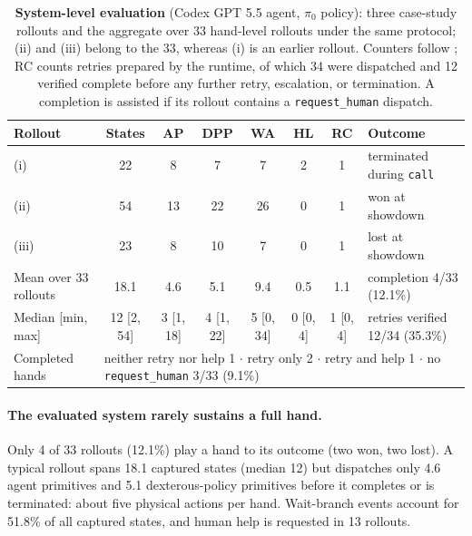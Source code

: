 \begin{table}[t]
    \caption{\textbf{System-level evaluation} (Codex GPT 5.5 agent, $\pi_0$ policy): three case-study rollouts and the aggregate over 33 hand-level rollouts under the same protocol; (ii) and (iii) belong to the 33, whereas (i) is an earlier rollout. Counters follow ; RC counts retries prepared by the runtime, of which 34 were dispatched and 12 verified complete before any further retry, escalation, or termination. A completion is assisted if its rollout contains a \texttt{request\_human} dispatch.}
    \label{tab:system_trajectory_summary}
    \centering
    \scriptsize
    \setlength{\tabcolsep}{3pt}
    \renewcommand{\arraystretch}{1.15}
    \begin{tabular*}{\linewidth}{@{\extracolsep{\fill}}lccccccl@{}}
        \toprule
        \textbf{Rollout} & \textbf{States} & \textbf{AP} & \textbf{DPP} & \textbf{WA} & \textbf{HL} & \textbf{RC} & \textbf{Outcome} \\
        \midrule
        (i)   & 22 &  8 &  7 &  7 & 2 & 1 & terminated during \texttt{call} \\
        (ii)  & 54 & 13 & 22 & 26 & 0 & 1 & won at showdown \\
        (iii) & 23 &  8 & 10 &  7 & 0 & 1 & lost at showdown \\
        \midrule
        Mean over 33 rollouts & 18.1 & 4.6 & 5.1 & 9.4 & 0.5 & 1.1 & completion 4/33 (12.1\%) \\
        Median [min, max]     & 12 [2, 54] & 3 [1, 18] & 4 [1, 22] & 5 [0, 34] & 0 [0, 4] & 1 [0, 4] & retries verified 12/34 (35.3\%) \\
        Completed hands       & \multicolumn{7}{l}{neither retry nor help 1 $\cdot$ retry only 2 $\cdot$ retry and help 1 $\cdot$ no \texttt{request\_human} 3/33 (9.1\%)} \\
        \bottomrule
    \end{tabular*}
    \vspace{-1.0em}
\end{table}

\paragraph{The evaluated system rarely sustains a full hand.} Only 4 of 33 rollouts (12.1\%) play a hand to its outcome (two won, two lost). A typical rollout spans 18.1 captured states (median 12) but dispatches only 4.6 agent primitives and 5.1 dexterous-policy primitives before it completes or is terminated: about five physical actions per hand. Wait-branch events account for 51.8\% of all captured states, and human help is requested in 13 rollouts.

